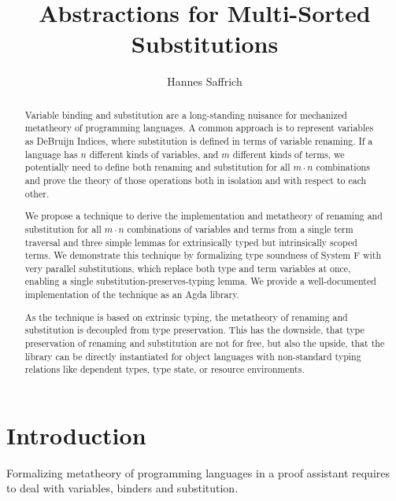 \documentclass[sigplan,10pt]{acmart}
\title{Abstractions for Multi-Sorted Substitutions}
\author{Hannes Saffrich}
\affiliation{
  \institution{University of Freiburg}      %
  \country{Germany}                         %
}
\begin{document}
  \begin{abstract}
    Variable binding and substitution are a long-standing nuisance for mechanized
    metatheory of programming languages. A common approach is to represent
    variables as DeBruijn Indices, where substitution is defined in terms of
    variable renaming. If a language has $n$ different kinds of variables, and
    $m$ different kinds of terms, we potentially need to define both
    renaming and substitution for all $m\cdot n$ combinations and prove the
    theory of those operations both in isolation and with respect to each other.


    We propose a technique to derive the implementation and metatheory of
    renaming and substitution for all $m\cdot n$ combinations of variables and terms
    from a single term traversal and three simple lemmas for extrinsically typed
    but intrinsically scoped terms.
    We demonstrate this technique by formalizing type soundness of System F with
    very parallel substitutions, which replace both type and term variables at
    once, enabling a single substitution-preserves-typing lemma.
    We provide a well-documented implementation of the technique as an Agda
    library.

    As the technique is based on extrinsic typing, the metatheory of renaming
    and substitution is decoupled from type preservation.
    This has the downside, that type preservation of renaming and substitution
    are not for free, but also the upside, that the library can be directly
    instantiated for object languages with non-standard typing relations like
    dependent types, type state, or resource environments.
  \end{abstract}

  \maketitle



  \AgdaNoSpaceAroundCode{}

  \section{Introduction}
  Formalizing metatheory of programming languages in a proof assistant 
  requires to deal with variables, binders and substitution.
\end{document}
